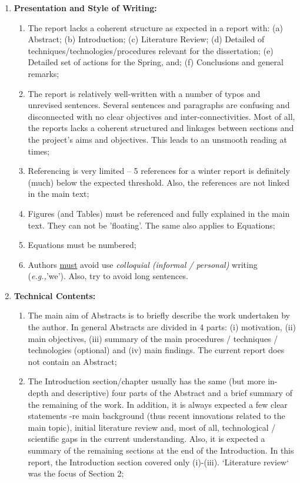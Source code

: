 \documentclass[14pt,twoside]{report}
\newcommand{\eg}{{\it e.g.,}}
\begin{document}
\begin{enumerate}
%
    \item {\bf Presentation and Style of Writing:}
               \begin{enumerate}
                   \item The report lacks a coherent structure as expected in a report with: (a) Abstract; (b) Introduction; (c) Literature Review; (d) Detailed of techniques/technologies/procedures relevant for the dissertation; (e) Detailed set of actions for the Spring, and; (f) Conclusions and general remarks;
                   \item The report is relatively well-written with a number of typos and unrevised sentences. Several sentences and paragraphs are confusing and disconnected with no clear objectives and inter-connectivities. Most of all, the reports lacks a coherent structured and linkages between sections and the project's aims and objectives. This leads to an unsmooth reading at times;
                   \item Referencing is very limited -- 5 references for a winter report is definitely (much) below the expected threshold. Also, the references are not linked in the main text;
                   \item Figures (and Tables) must be referenced and fully explained in the main text. They can not be 'floating'. The same also applies to Equations;
                   \item Equations must be numbered;  
                   \item Authors \underline{must} avoid use {\it colloquial (informal / personal)} writing (\eg 'we'). Also, try to avoid long sentences.
                \end{enumerate}
%
    \item {\bf Technical Contents:}
                \begin{enumerate}
                   \item The main aim of Abstracts is to briefly describe the work undertaken by the author. In general Abstracts are divided in 4 parts: (i) motivation, (ii) main objectives, (iii) summary of the main procedures / techniques / technologies (optional) and (iv) main findings. The current report does not contain an Abstract;
                   \item The Introduction section/chapter usually has the same (but more in-depth and descriptive) four parts of the Abstract and a brief summary of the remaining of the work. In addition, it is always expected a few clear statements -re main background (thus recent innovations related to the main topic), initial literature review and, most of all, technological / scientific gaps in the current understanding. Also, it is expected a summary of the remaining sections at the end of the Introduction. In this report, the Introduction section covered only (i)-(iii). `Literature review` was the focus of Section 2;

\end{enumerate}
\end{enumerate}
\end{document}
